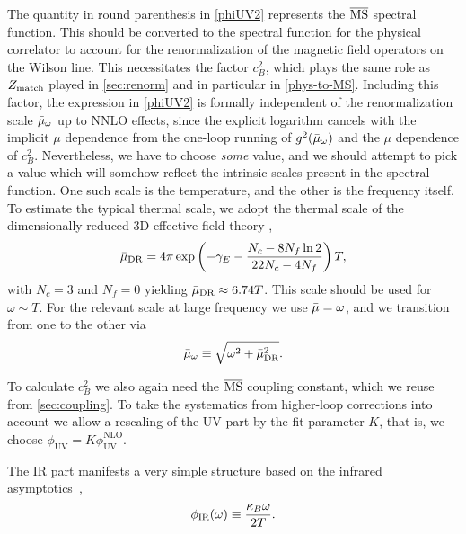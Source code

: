 \documentclass[floatfix,twocolumn,prd,showpacs,preprintnumbers,amsmath,nofootinbib,amssymb,superscriptaddress]{revtex4-2}
\begin{document}
The quantity in round parenthesis in \cref{phiUV2} represents the $\overline{\text{MS}}$ spectral function.
This should be converted to the spectral function for the physical correlator to account for the renormalization of the magnetic field operators on the Wilson line.
This necessitates the factor $c_B^2$, which plays the same role as $Z_{\mathrm{match}}$ played in \cref{sec:renorm} and in particular in \cref{phys-to-MS}.
Including this factor,
the expression in \cref{phiUV2} is formally independent of the renormalization scale $\bar{\mu}_\omega$ up to NNLO effects, since the explicit logarithm cancels with the implicit $\mu$ dependence from the one-loop running of $g^2(\bar{\mu}_\omega)$ and the $\mu$ dependence of $c_B^2$.
Nevertheless, we have to choose \textit{some} value, and we should attempt to pick a value which will somehow reflect the intrinsic scales present in the spectral function.
One such scale is the temperature, and the other is the frequency itself.
To estimate the typical thermal scale, we adopt the thermal scale of the dimensionally reduced 3D effective field theory \cite{Kajantie:1997tt},
\begin{align}
    \bar{\mu}_{\mathrm{DR}}=4 \pi  \exp \left(-\gamma_E-\frac{N_c-8 N_f \ln 2}{22 N_c-4 N_f}\right) T,
\end{align}
with $N_c=3$ and $N_f=0$ yielding $\bar{\mu}_{\mathrm{DR}}\approx 6.74T$.
This scale should be used for $\omega \sim T$.
For the relevant scale at large frequency we use $\bar{\mu} = \omega$, and we transition from one to the other via
\begin{align}
\bar{\mu}_{\omega} \equiv \sqrt{\omega^2 + \bar{\mu}_{\mathrm{DR}}^2}.
\end{align}

To calculate $c_B^2$ we also again need the $\overline{\text{MS}}$ coupling constant, which we reuse from \cref{sec:coupling}.
To take the systematics from higher-loop corrections into account we allow a rescaling of the UV part by the fit parameter $K$,
that is, we choose $\phi_{\mathrm{UV}} = K \phi^{\mathrm{NLO}}_{\mathrm{UV}}$.

The IR part manifests a very simple structure based on the infrared asymptotics~\cite{CaronHuot:2009uh},
\begin{align}
    \phi_{\rm{IR}}(\omega) \equiv \frac{\kappa_B \omega}{2T}.
    \label{phiIR}   
\end{align}
\end{document}
